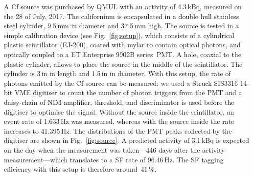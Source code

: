 A Cf source was purchased by QMUL with an activity of 4.3\,kBq, measured on the 28 of July, 2017.
The californium is encapsulated in a double hull stainless steel cylinder, 9.5\,mm in diameter and 37.5\,mm high.
The source is tested in a simple calibration device (see Fig.~\ref{fig:setup}), which consists of a cylindrical plastic scintillator %
(EJ-200), coated with mylar to contain optical photons, and optically coupled to a ET Enterprise 9902B series~PMT.
A hole, coaxial to the plastic cylinder, allows to place the source in the middle of the scintillator.
The cylinder is 3\,in in length and 1.5\,in in diameter.
With this setup, the rate of photons emitted by the Cf source can be measured; %
we used a Struck SIS3316 14-bit VME digitiser to count the number of photon triggers from the PMT and %
a daisy-chain of NIM amplifier, threshold, and discriminator is used before the digitiser to optimise the signal.
Without the source inside the scintillator, an event rate of 1.633\,Hz was measured, whereas with the source inside %
the rate increases to 41.395\,Hz.
The distributions of the PMT peaks collected by the digitiser are shown in Fig.~\ref{fig:source}.
A predicted activity of 3.1\,kBq is expected on the day when the measurement was %
taken---446 days after the activity measurement---which translates to a SF rate of 96.46\,Hz.
The SF tagging efficiency with this setup is therefore around~41\,\%.

\begin{figure}
	\begin{minipage}[t]{0.48\textwidth}
		\centering
		\resizebox{\textwidth}{!}{}
		\label{fig:source}
	\end{minipage}
	\hfill
	\begin{minipage}[t]{0.48\textwidth}
		\centering
		\resizebox{\textwidth}{!}{}
		\label{fig:QE}
	\end{minipage}
\end{figure}

